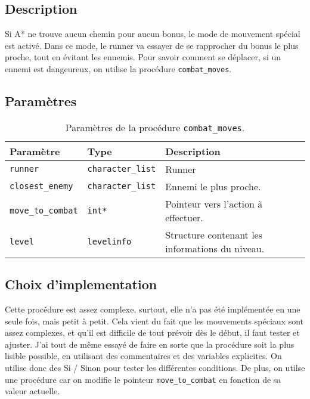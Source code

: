 \subsection{Description}

Si A* ne trouve aucun chemin pour aucun bonus, le mode de mouvement spécial est activé.
Dans ce mode, le runner va essayer de se rapprocher du bonus le plus proche, tout en évitant les ennemis.
Pour savoir comment se déplacer, si un ennemi est dangeureux, on utilise la procédure \texttt{combat\_moves}.


\subsection{Paramètres}

\begin{table}[!htpb]
    \begin{tabularx}{\textwidth}{lXX}
        \toprule
        \textbf{Paramètre} & \textbf{Type} & \textbf{Description} \\
        \midrule
        \texttt{runner} & \texttt{character\_list} & Runner \\
        \texttt{closest\_enemy} & \texttt{character\_list} & Ennemi le plus proche. \\
        \texttt{move\_to\_combat} & \texttt{int*} & Pointeur vers l'action à effectuer. \\
        \texttt{level} & \texttt{levelinfo} & Structure contenant les informations du niveau. \\
        \bottomrule
    \end{tabularx}
    \caption{Paramètres de la procédure \texttt{combat\_moves}.}
    \label{tab:parameters-combat_moves}
\end{table}

\subsection{Choix d'implementation}

Cette procédure est assez complexe, surtout, elle n'a pas été implémentée en une seule fois, mais petit à petit.
Cela vient du fait que les mouvements spéciaux sont assez complexes, et qu'il est difficile de tout prévoir dès le début, il faut tester et ajuster.
J'ai tout de même essayé de faire en sorte que la procédure soit la plus lisible possible, en utilisant des commentaires et des variables explicites.
On utilise donc des Si / Sinon pour tester les différentes conditions.
De plus, on utilse une procédure car on modifie le pointeur \texttt{move\_to\_combat} en fonction de sa valeur actuelle.

